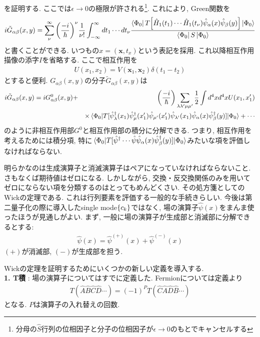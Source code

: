 \documentclass[10.5pt,a4paper]{jreport}
\newcommand{\bx}{\bm{x}}
\newcommand{\hpsi}{\hat{\psi}}
\begin{document}
を証明する. ここでは$\epsilon\rightarrow 0$の極限が許される\footnote{分母の$\hat{S}$行列の位相因子と分子の位相因子が$\epsilon\rightarrow 0$のもとでキャンセルする}. これにより, Green関数を
\begin{eqnarray}
  i\tilde{G}_{\alpha\beta}(x, y) = \sum_\nu^\infty \qty(\frac{-i}{\hbar})^\nu \frac{1}{\nu!}\int_{-\infty}^\infty dt_1\cdots dt_\nu\frac{\bra{\Phi_0}T\qty[\hat{H}_1(t_1)\cdots\hat{H}_1(t_\nu)\hpsi_\alpha(x)\hpsi_\beta(y)]\ket{\Phi_0}}{\bra{\Phi_0}S\ket{\Phi_0}}
\end{eqnarray}
と書くことができる. いつもの$x = (\bx, t_x)$という表記を採用. これ以降相互作用描像の添字$I$を省略する. ここで相互作用を
\begin{eqnarray}
  U(x_1, x_2) = V(\bx_1, \bx_2)\delta(t_1 - t_2)
\end{eqnarray}
とすると便利. $G_{\alpha\beta}(x, y)$の分子$\tilde{G}_{\alpha\beta}(x, y)$は
\begin{eqnarray}
\nonumber  i\tilde{G}_{\alpha\beta}(x, y) = iG^0_{\alpha\beta}(x, y) &+& \qty(\frac{-i}{\hbar})\sum_{\lambda\lambda'\mu\mu'}\frac{1}{2}\int d^4xd^4x U(x_1, x_1')\\
  &&\times \ev{T[\hpsi_{\lambda}^\dagger(x_1)\hpsi^\dagger_{\mu}(x_1')\hpsi_{\mu'}(x_1')\hpsi_{\lambda'}(x_1)\hpsi_{\alpha}(x)\hpsi^\dagger_{\beta}(y)]}{\Phi_0} + \cdots
\end{eqnarray}
のように非相互作用部$G^0$と相互作用部の積分に分解できる. つまり, 相互作用を考えるためには積分項, 特に$\ev{T[\hpsi^\dagger\cdots\hpsi\hpsi_{\alpha}(x)\hpsi^\dagger_{\beta}(y)]}{\Phi_0}$みたいな項を評価しなければならない.

明らかなのは生成演算子と消滅演算子はペアになっていなければならないこと. さもなくば期待値はゼロになる. しかしながら, 交換・反交換関係のみを用いてゼロにならない項を分類するのはとってもめんどくさい. その処方箋としてのWickの定理である. これは行列要素を評価する一般的な手続きらしい. 今後は第二量子化の際に導入したsingle mode$\qty{c_k}$ではなく, 場の演算子$\hpsi(x)$をまんま使ったほうが見通しがよい. まず, 一般に場の演算子が生成部と消滅部に分解できるとする:
\begin{eqnarray}
  \hpsi(x) = \hpsi^{(+)}(x) + \hpsi^{(-)}(x)
\end{eqnarray}
$(+)$が消滅部, $(-)$が生成部を担う.

Wickの定理を証明するためにいくつかの新しい定義を導入する.\\

\textbf{1. T積} : 場の演算子についてはすでに定義した. Fermionについては定義より
\begin{eqnarray}
  T(\hat{A}\hat{B}\hat{C}\hat{D}\cdots) = (-1)^PT(\hat{C}\hat{A}\hat{D}\hat{B}\cdots)
\end{eqnarray}
となる. $P$は演算子の入れ替えの回数. \\
\end{document}
